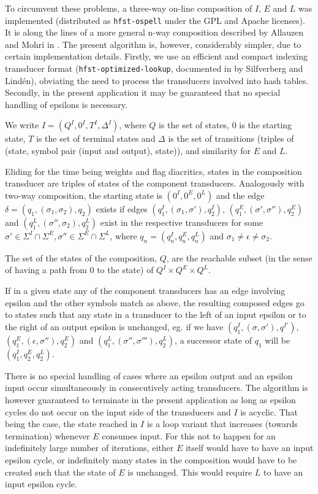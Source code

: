 \documentclass{llncs}
\begin{document}
To circumvent these problems, a three-way on-line composition of $I$, $E$ and
$L$ was implemented (distributed as \verb!hfst-ospell!
under the GPL and Apache licenses). It is along the lines of a more general
n-way composition described by Allauzen and Mohri in \cite{allauzen/2009}.
The present algorithm is, however, considerably simpler, due to certain
implementation details. Firstly, we use an efficient and compact indexing
transducer format (\verb!hfst-optimized-lookup!, documented in
\cite{silfverberg/2009/ol} by Silfverberg and Lind\'{e}n), obviating the
need to process the transducers involved into hash tables. Secondly,
in the present application it may be guaranteed that no special handling
of epsilons is necessary.

We write $I = (Q^I, 0^I, T^I, \Delta^I)$, where $Q$
is the set of states, $0$ is the starting state, $T$ is the set of terminal
states and $\Delta$ is the set of transitions (triples of (state, symbol pair
(input and output), state)), and similarity for $E$ and $L$.

Eliding for the time being weights and flag diacritics, states in the
composition transducer are triples of states of the component transducers.
Analogously with two-way composition, the starting state is $(0^I, 0^E, 0^L)$
and the edge $\delta = (q_1, (\sigma_1, \sigma_2), q_2)$ exists if edges
$(q^I_1, (\sigma_1, \sigma'), q^I_2)$,
$(q^E_1, (\sigma', \sigma''), q^E_2)$ and
$(q^L_1, (\sigma'', \sigma_2), q^L_2)$ exist in the respective transducers
for some
$\sigma' \in \Sigma^I \cap \Sigma^E, \sigma'' \in \Sigma^E \cap \Sigma^L$,
where $q_n = (q^I_n, q^E_n, q^L_n)$ and $\sigma_1 \neq \epsilon \neq \sigma_2$.

The set of the states of the composition, $Q$, are the reachable subset
(in the sense of having a path from $0$ to the state) of
$Q^I \times Q^E \times Q^L$.

If in a given state any of the component transducers has an edge involving
epsilon and the other symbols match as above, the resulting composed edges
go to states such that any state in a transducer to the left of an input
epsilon or to the right of an output epsilon is unchanged, eg. if we have
$(q^I_1, (\sigma, \sigma'), q^{I'})$, $(q^E_1, (\epsilon, \sigma''), q^E_2)$ and
$(q^L_1, (\sigma'', \sigma'''), q^L_2)$, a successor state of $q_1$ will be
$(q^I_1, q^E_2, q^L_2)$.

There is no special handling of cases where an epsilon output and an epsilon
input occur simultaneously in consecutively acting transducers. The algorithm
is however guaranteed to terminate in the present application as long as
epsilon cycles do not occur on the input side of the transducers and $I$
is acyclic. That being the case, the state reached in $I$ is a loop variant
that increases (towards termination) whenever $E$ consumes input. For this
not to happen for an indefinitely large number of iterations, either $E$
itself would have to have an input epsilon cycle, or indefinitely many states
in the composition would have to be created such that the state of $E$ is
unchanged. This would require $L$ to have an input epsilon cycle.
\end{document}
